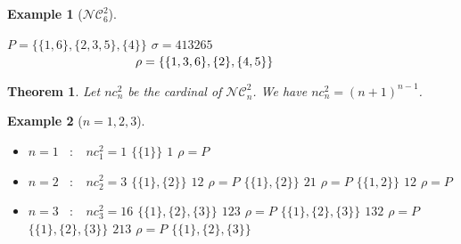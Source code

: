 \documentclass[12pt]{report}
\newtheorem{theorem}{Theorem}
\newtheorem*{example}{Example}
\begin{document}
\begin{example}[$\mathcal{NC}^2_6$]
    \begin{itemize*}
            \subitem $P = \{\{1, 6\}, \{2, 3, 5\}, \{4\}\}$
            \subitem $\sigma = 413265$ \\
            \subitem $\hspace{36mm} \rho = \{\{1, 3, 6\}, \{2\}, \{4, 5\}\}$
    \end{itemize*}    
\end{example}

\begin{theorem}
    Let $nc^2_n$ be the cardinal of $\mathcal{NC}^2_n$.
    We have $nc^2_n = (n + 1)^{n-1}$.
\end{theorem}

\begin{example}[$n = 1, 2, 3$]
    ~\\
    \begin{itemize}
            \item $n = 1$ \  $:$ \  $nc^2_1 = 1$
            \subitem $\{\{1\}\}$ \hspace{1cm} $1$
                \hspace{1cm} $\rho = P$
            \item $n = 2$ \  $:$ \  $nc^2_2 = 3$
            \subitem $\{\{1\}, \{2\}\}$ \hspace{1cm} $12$
                \hspace{1cm} $\rho = P$
            \subitem $\{\{1\}, \{2\}\}$ \hspace{1cm} $21$
                \hspace{1cm} $\rho = P$
            \subitem $\{\{1, 2\}\}$ \hspace{14mm} $12$
                \hspace{1cm} $\rho = P$
            \item $n = 3$ \  $:$ \  $nc^2_3 = 16$
            \subitem $\{\{1\}, \{2\}, \{3\}\}$ \hspace{1cm}
                $123$ \hspace{1cm} $\rho = P$
            \subitem $\{\{1\}, \{2\}, \{3\}\}$ \hspace{1cm}
                $132$ \hspace{1cm} $\rho = P$
            \subitem $\{\{1\}, \{2\}, \{3\}\}$ \hspace{1cm}
                $213$ \hspace{1cm} $\rho = P$
            \subitem $\{\{1\}, \{2\}, \{3\}\}$ \hspace{1cm}

\end{itemize}
\end{example}
\end{document}
